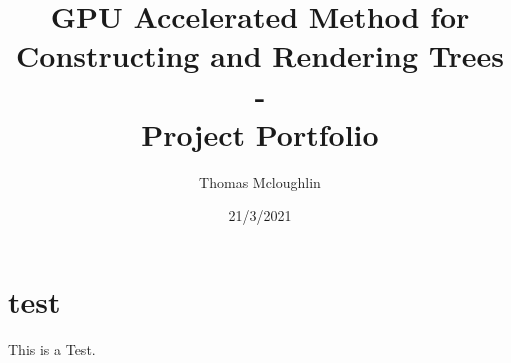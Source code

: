 \documentclass[final]{cmpreport}
\title{GPU Accelerated Method for Constructing and Rendering Trees 
        \\ - \\ 
        {Project Portfolio}}
\author{Thomas Mcloughlin}
\date{21/3/2021}
\begin{document}
\section{test}
This is a \citep{prusinkiewicz1996systems} Test.



\end{document}
